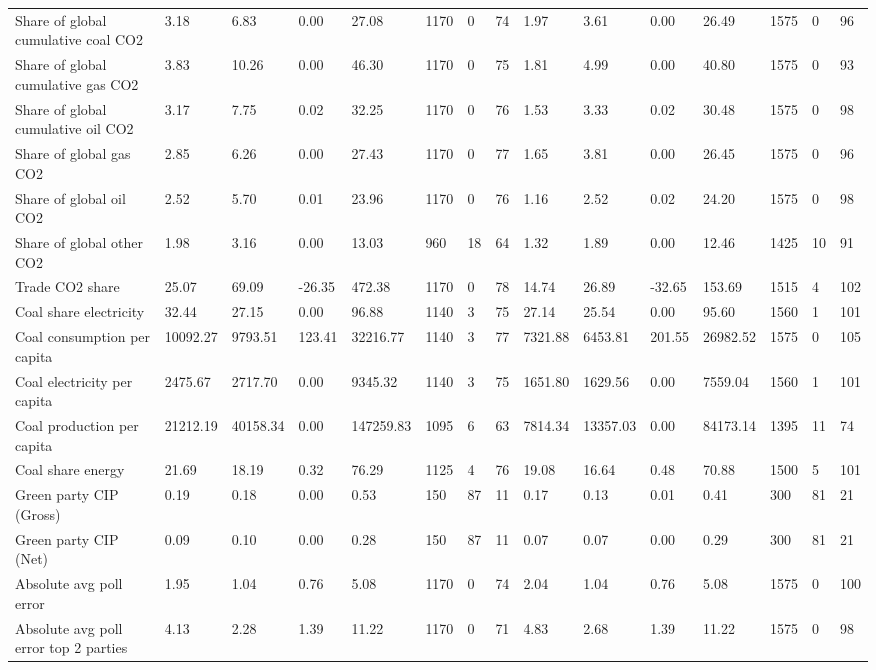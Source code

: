 \begin{longtable}{lllllllllllllll}
Share of global cumulative coal CO2 & 3.18 & 6.83 & 0.00 & 27.08 & 1170 & 0 & 74 & 1.97 & 3.61 & 0.00 & 26.49 & 1575 & 0 & 96\\
Share of global cumulative gas CO2 & 3.83 & 10.26 & 0.00 & 46.30 & 1170 & 0 & 75 & 1.81 & 4.99 & 0.00 & 40.80 & 1575 & 0 & 93\\
\addlinespace
Share of global cumulative oil CO2 & 3.17 & 7.75 & 0.02 & 32.25 & 1170 & 0 & 76 & 1.53 & 3.33 & 0.02 & 30.48 & 1575 & 0 & 98\\
Share of global gas CO2 & 2.85 & 6.26 & 0.00 & 27.43 & 1170 & 0 & 77 & 1.65 & 3.81 & 0.00 & 26.45 & 1575 & 0 & 96\\
Share of global oil CO2 & 2.52 & 5.70 & 0.01 & 23.96 & 1170 & 0 & 76 & 1.16 & 2.52 & 0.02 & 24.20 & 1575 & 0 & 98\\
Share of global other CO2 & 1.98 & 3.16 & 0.00 & 13.03 & 960 & 18 & 64 & 1.32 & 1.89 & 0.00 & 12.46 & 1425 & 10 & 91\\
Trade CO2 share & 25.07 & 69.09 & -26.35 & 472.38 & 1170 & 0 & 78 & 14.74 & 26.89 & -32.65 & 153.69 & 1515 & 4 & 102\\
\addlinespace
Coal share electricity & 32.44 & 27.15 & 0.00 & 96.88 & 1140 & 3 & 75 & 27.14 & 25.54 & 0.00 & 95.60 & 1560 & 1 & 101\\
Coal consumption per capita & 10092.27 & 9793.51 & 123.41 & 32216.77 & 1140 & 3 & 77 & 7321.88 & 6453.81 & 201.55 & 26982.52 & 1575 & 0 & 105\\
Coal electricity per capita & 2475.67 & 2717.70 & 0.00 & 9345.32 & 1140 & 3 & 75 & 1651.80 & 1629.56 & 0.00 & 7559.04 & 1560 & 1 & 101\\
Coal production per capita & 21212.19 & 40158.34 & 0.00 & 147259.83 & 1095 & 6 & 63 & 7814.34 & 13357.03 & 0.00 & 84173.14 & 1395 & 11 & 74\\
Coal share energy & 21.69 & 18.19 & 0.32 & 76.29 & 1125 & 4 & 76 & 19.08 & 16.64 & 0.48 & 70.88 & 1500 & 5 & 101\\
\addlinespace
Green party CIP (Gross) & 0.19 & 0.18 & 0.00 & 0.53 & 150 & 87 & 11 & 0.17 & 0.13 & 0.01 & 0.41 & 300 & 81 & 21\\
Green party CIP (Net) & 0.09 & 0.10 & 0.00 & 0.28 & 150 & 87 & 11 & 0.07 & 0.07 & 0.00 & 0.29 & 300 & 81 & 21\\
Absolute avg poll error & 1.95 & 1.04 & 0.76 & 5.08 & 1170 & 0 & 74 & 2.04 & 1.04 & 0.76 & 5.08 & 1575 & 0 & 100\\
Absolute avg poll error top 2 parties & 4.13 & 2.28 & 1.39 & 11.22 & 1170 & 0 & 71 & 4.83 & 2.68 & 1.39 & 11.22 & 1575 & 0 & 98\\

\end{longtable}

